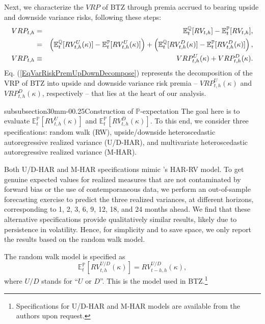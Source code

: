\documentclass[11pt]{article}
\makeatletter
\renewcommand\subsubsection{\@startsection%
    {subsubsection}{3}{0mm}{-0\baselineskip}{0.25\baselineskip}{\itshape\large}}
\makeatother
\begin{document}
Next, we characterize the $VRP$ of BTZ through premia accrued to bearing upside and downside variance risks, following these steps:
\begin{eqnarray}
VRP_{t,h} &=&\mathbb{E}_{t}^{\mathbb{Q}}[RV_{t,h}]-\mathbb{E}_{t}^{\mathbb{P}}[RV_{t,h}],  \notag \\
&=& \left(\mathbb{E}_{t}^{\mathbb{Q}}[RV_{t,h}^{U}(\kappa )]-\mathbb{E}_{t}^{\mathbb{P}}[RV_{t,h}^{U}(\kappa )] \right)+\left(\mathbb{E}_{t}^{\mathbb{Q}}[RV_{t,h}^{D}(\kappa )]-\mathbb{E}_{t}^{\mathbb{P}}[RV_{t,h}^{D}(\kappa )]\right),\notag\\
VRP_{t,h} &\equiv& VRP_{t,h}^{U}(\kappa )+VRP_{t,h}^{D}(\kappa ). \label{EqVarRiskPremUpDownDecompose}
\end{eqnarray}
Eq. (\ref{EqVarRiskPremUpDownDecompose}) represents the decomposition of the VRP of BTZ into upside and downside variance risk premia -- $VRP_{t,h}^{U}(\kappa )$ and $VRP_{t,h}^{D}(\kappa )$, respectively -- that lies at the heart of our analysis.

\subsubsection{Construction of $\mathbb{P}$-expectation}\label{SecPexp}
The goal here is to evaluate $\mathbb{E}_{t}^{\mathbb{P}}[RV_{t,h}^{U}(\kappa )]$ and $\mathbb{E}_{t}^{\mathbb{P}}[RV_{t,h}^{D}(\kappa )]$. To this end, we consider three specifications: random walk (RW), upside/downside heteroscedastic autoregressive realized variance (U/D-HAR), and multivariate heteroscedastic autoregressive realized variance (M-HAR).

Both U/D-HAR and M-HAR specifications mimic \cite{Corsi09HAR}'s HAR-RV model. To get genuine expected values for realized measures that are not contaminated by forward bias or the use of contemporaneous data, we perform an out-of-sample forecasting exercise to predict the three realized variances, at different horizons, corresponding to 1, 2, 3, 6, 9, 12, 18, and 24 months ahead. We find that these alternative specifications provide qualitatively similar results, likely due to persistence in volatility. Hence, for simplicity and to save space, we only report the results based on the random walk model.

The random walk model is specified as $$\mathbb{E}_{t}^{\mathbb{P}}[RV_{t,h}^{U/D}(\kappa )]=RV_{t-h,h}^{U/D}(\kappa ),$$ where $U/D$ stands for ``$U$ or $D$''. This is the model used in BTZ.\footnote{Specifications for U/D-HAR and M-HAR models are available from the authors upon request.}
\end{document}
